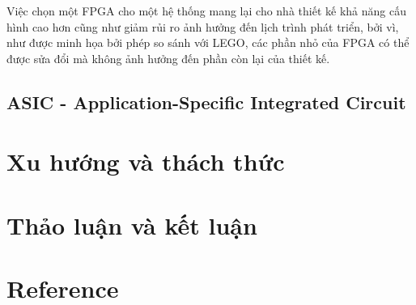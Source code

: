 \documentclass[a4paper]{article}
\begin{document}
Việc chọn một FPGA cho một hệ thống mang lại cho nhà thiết kế khả năng cấu hình cao hơn cũng như giảm rủi ro ảnh hưởng đến lịch trình phát triển, bởi vì, như được minh họa bởi phép so sánh với LEGO, các phần nhỏ của FPGA có thể được sửa đổi mà không ảnh hưởng đến phần còn lại của thiết kế.
\subsection{ASIC - Application-Specific Integrated Circuit}
\section{Xu hướng và thách thức}
\section{Thảo luận và kết luận}
\section{Reference}
\end{document}
